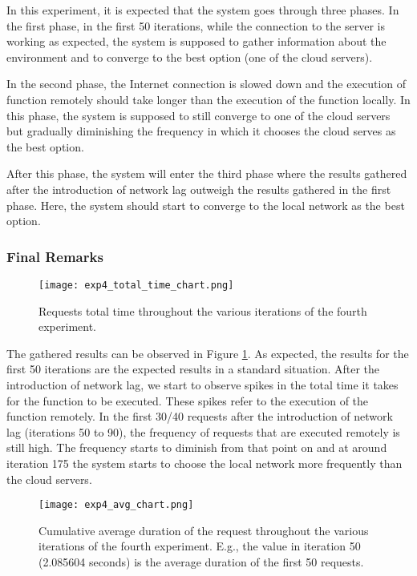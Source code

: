 In this experiment, it is expected that the system goes through three phases. In
the first phase, in the first 50 iterations, while the connection to the server is
working as expected, the system is supposed to gather information about the
environment and to converge to the best option (one of the cloud servers).

In the second phase, the Internet connection is slowed down and the execution of
function remotely should take longer than the execution of the function locally.
In this phase, the system is supposed to still converge to one of the cloud
servers but gradually diminishing the frequency in which it chooses the cloud
serves as the best option.

After this phase, the system will enter the third phase where the results gathered
after the introduction of network lag outweigh the results gathered in the first
phase. Here, the system should start to converge to the local network as the
best option.


\subsubsection{Final Remarks}

\begin{figure}[h]
  \begin{center}
    \texttt{[image: exp4\_total\_time\_chart.png]}
    \caption{Requests total time throughout the various iterations of the
    fourth experiment.}
    \label{fig:exp4_total_time_chart}
  \end{center}
\end{figure}


The gathered results can be observed in Figure \ref{fig:exp4_total_time_chart}. As
expected, the results for the first 50 iterations are the expected results in a
standard situation. After the introduction of network lag, we start to observe
spikes in the total time it takes for the function to be executed. These spikes
refer to the execution of the function remotely. In the first 30/40 requests after
the introduction of network lag (iterations 50 to 90), the frequency of requests
that are executed remotely is still high. The frequency starts to diminish
from that point on and at around iteration 175 the system starts to choose the
local network more frequently than the cloud servers.

\begin{figure}[h]
  \begin{center}
    \texttt{[image: exp4\_avg\_chart.png]}
    \caption{Cumulative average duration of the request throughout the various iterations of the fourth experiment. E.g., the value in iteration 50 (2.085604 seconds) is the average duration of the first 50 requests.}
    \label{fig:exp4_avg_chart}
  \end{center}
\end{figure}

